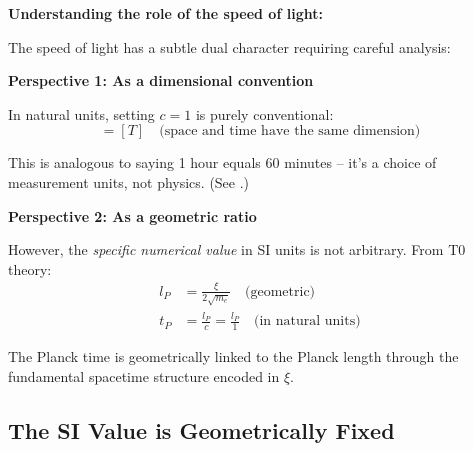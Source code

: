 	\begin{derivation}
		\textbf{Understanding the role of the speed of light:}
		
		The speed of light has a subtle dual character requiring careful analysis:
		
		\textbf{Perspective 1: As a dimensional convention}
		
		In natural units, setting $c = 1$ is purely conventional:
		\begin{equation}
			[L] = [T] \quad \text{(space and time have the same dimension)}
		\end{equation}
		
		This is analogous to saying 1 hour equals 60 minutes -- it's a choice of measurement units, not physics. (See \cite{unit_conventions_c_speed_En}.)
		
		\textbf{Perspective 2: As a geometric ratio}
		
		However, the \emph{specific numerical value} in SI units is not arbitrary. From T0 theory:
		\begin{align}
			l_P &= \frac{\xi}{2\sqrt{m_e}} \quad \text{(geometric)} \\
			t_P &= \frac{l_P}{c} = \frac{l_P}{1} \quad \text{(in natural units)}
		\end{align}
		
		The Planck time is geometrically linked to the Planck length through the fundamental spacetime structure encoded in $\xi$.
	\end{derivation}
	
	\subsection{The SI Value is Geometrically Fixed}
	
